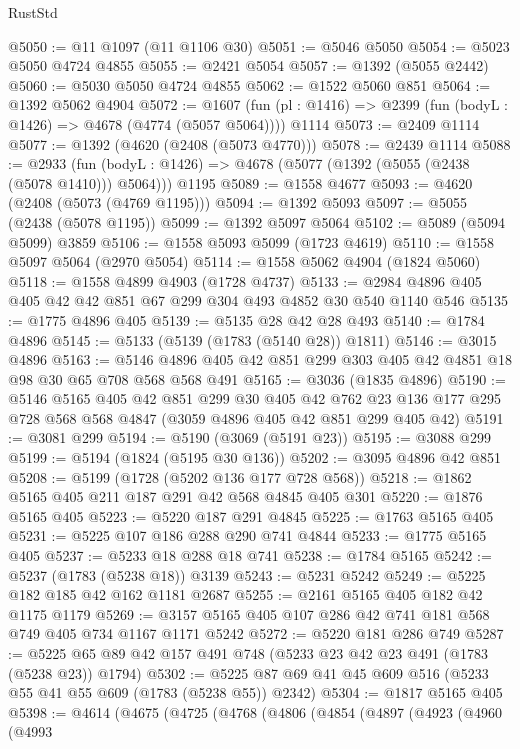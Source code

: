 \begin{lexlean}{RustStd}
\begin{coremodule}
@5050 := @11 @1097 (@11 @1106 @30)
@5051 := @5046 @5050
@5054 := @5023 @5050 @4724 @4855
@5055 := @2421 @5054
@5057 := @1392 (@5055 @2442)
@5060 := @5030 @5050 @4724 @4855
@5062 := @1522 @5060 @851
@5064 := @1392 @5062 @4904
@5072 := @1607
    (fun (pl : @1416) => @2399 (fun (bodyL : @1426) => @4678 (@4774 (@5057 @5064))))
    @1114
@5073 := @2409 @1114
@5077 := @1392 (@4620 (@2408 (@5073 @4770)))
@5078 := @2439 @1114
@5088 := @2933
    (fun (bodyL : @1426) => @4678 (@5077 (@1392 (@5055 (@2438 (@5078 @1410))) @5064)))
    @1195
@5089 := @1558 @4677
@5093 := @4620 (@2408 (@5073 (@4769 @1195)))
@5094 := @1392 @5093
@5097 := @5055 (@2438 (@5078 @1195))
@5099 := @1392 @5097 @5064
@5102 := @5089 (@5094 @5099) @3859
@5106 := @1558 @5093 @5099 (@1723 @4619)
@5110 := @1558 @5097 @5064 (@2970 @5054)
@5114 := @1558 @5062 @4904 (@1824 @5060)
@5118 := @1558 @4899 @4903 (@1728 @4737)
@5133 := @2984 @4896 @405 @405 @42 @42 @851 @67 @299 @304 @493 @4852 @30 @540 @1140 @546
@5135 := @1775 @4896 @405
@5139 := @5135 @28 @42 @28 @493
@5140 := @1784 @4896
@5145 := @5133 (@5139 (@1783 (@5140 @28)) @1811)
@5146 := @3015 @4896
@5163 := @5146 @4896 @405 @42 @851 @299 @303 @405 @42 @4851 @18 @98 @30 @65 @708 @568 @568 @491
@5165 := @3036 (@1835 @4896)
@5190 := @5146
    @5165
    @405
    @42
    @851
    @299
    @30
    @405
    @42
    @762
    @23
    @136
    @177
    @295
    @728
    @568
    @568
    @4847
    (@3059 @4896 @405 @42 @851 @299 @405 @42)
@5191 := @3081 @299
@5194 := @5190 (@3069 (@5191 @23))
@5195 := @3088 @299
@5199 := @5194 (@1824 (@5195 @30 @136))
@5202 := @3095 @4896 @42 @851
@5208 := @5199 (@1728 (@5202 @136 @177 @728 @568))
@5218 := @1862 @5165 @405 @211 @187 @291 @42 @568 @4845 @405 @301
@5220 := @1876 @5165 @405
@5223 := @5220 @187 @291 @4845
@5225 := @1763 @5165 @405
@5231 := @5225 @107 @186 @288 @290 @741 @4844
@5233 := @1775 @5165 @405
@5237 := @5233 @18 @288 @18 @741
@5238 := @1784 @5165
@5242 := @5237 (@1783 (@5238 @18)) @3139
@5243 := @5231 @5242
@5249 := @5225 @182 @185 @42 @162 @1181 @2687
@5255 := @2161 @5165 @405 @182 @42 @1175 @1179
@5269 := @3157 @5165 @405 @107 @286 @42 @741 @181 @568 @749 @405 @734 @1167 @1171 @5242
@5272 := @5220 @181 @286 @749
@5287 := @5225 @65 @89 @42 @157 @491 @748 (@5233 @23 @42 @23 @491 (@1783 (@5238 @23)) @1794)
@5302 := @5225 @87 @69 @41 @45 @609 @516 (@5233 @55 @41 @55 @609 (@1783 (@5238 @55)) @2342)
@5304 := @1817 @5165 @405
@5398 := @4614
    (@4675
      (@4725
        (@4768
          (@4806
            (@4854
              (@4897
                (@4923
                  (@4960
                    (@4993

\end{coremodule}
\end{lexlean}
